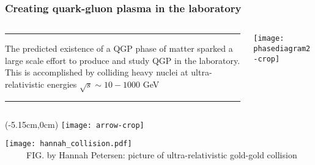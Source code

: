 \documentclass[svgnames]{beamer}
\begin{document}
\begin{frame}
 \frametitle{Creating quark-gluon plasma in the laboratory}
 
 \begin{columns}[T]
  \begin{column}{0.5\textwidth}
    \hrule
    \vspace{0.1 in}
    The predicted existence of a QGP phase of matter sparked a large scale effort to produce and study QGP in the laboratory. \\
    \vspace{0.1 in}
    This is accomplished by colliding heavy nuclei at ultra-relativistic energies $\sqrt{s} \sim 10-1000$ GeV
    \vspace{0.1 in}
    \hrule
  \end{column}
  \begin{column}{0.4\textwidth}
   \texttt{[image: phasediagram2-crop]}
  \end{column}
 \end{columns}
 
 \centering
 \begin{textblock*}{\linewidth}(-5.15cm,0cm)
  \texttt{[image: arrow-crop]}\vspace{0.5 in}
\end{textblock*}
 \hspace{0.3 in}
 \texttt{[image: hannah\_collision.pdf]} \\
 \vspace{-0.1 in} {\tiny ~~~~~FIG. by Hannah Petersen: picture of ultra-relativistic gold-gold collision}
\end{frame}
\end{document}
